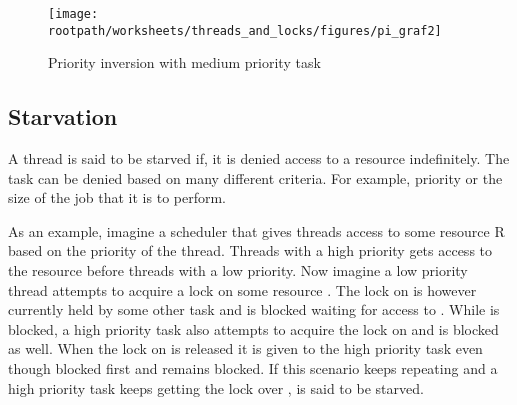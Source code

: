\begin{figure}[htbp]
\centering
 \texttt{[image: \\rootpath/worksheets/threads\_and\_locks/figures/pi\_graf2]} 
 \caption{Priority inversion with medium priority task}
\label{fig:priority_inversion_m}
\end{figure}
\subsection{Starvation}
A thread is said to be starved if, it is denied access to a resource indefinitely\cite[p. 459]{tanenbaum2008modern}. The task can be denied based on many different criteria. For example, priority or the size of the job that it is to perform.

As an example, imagine a scheduler that gives threads access to some resource R based on the priority of the thread. Threads with a high priority gets access to the resource before threads with a low priority. Now imagine a low priority thread  attempts to acquire a lock on some resource . The lock on  is however currently held by some other task and  is blocked waiting for access to . While  is blocked, a high priority task  also attempts to acquire the lock on  and is blocked as well. When the lock on  is released it is given to the high priority task  even though  blocked first and  remains blocked. If this scenario keeps repeating and a high priority task keeps getting the lock over ,  is said to be starved.


